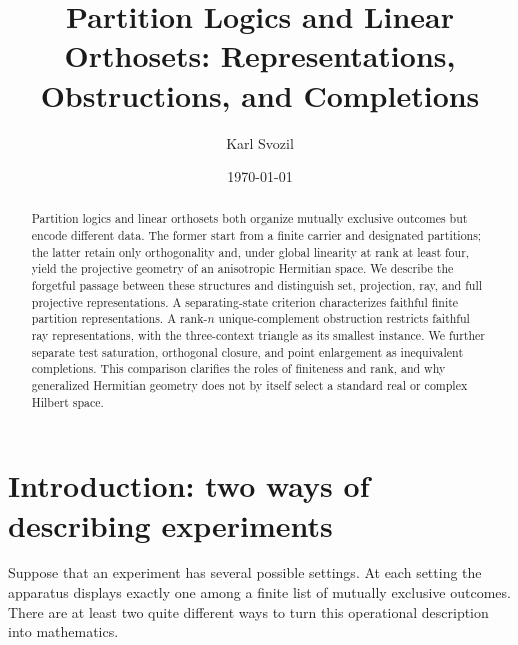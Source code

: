 \documentclass[
  aps,
  pra,
  twocolumn,
  amsmath,
  amssymb,
  longbibliography,
  nofootinbib,
  floatfix
]{revtex4-2}
\begin{document}
\title{Partition Logics and Linear Orthosets:
Representations, Obstructions, and Completions}

\author{Karl Svozil}

\date{\today}

\begin{abstract}
Partition logics and linear orthosets both organize mutually exclusive
outcomes but encode different data.  The former start from a finite carrier and
designated partitions; the latter retain only orthogonality and, under global
linearity at rank at least four, yield the projective geometry of an anisotropic
Hermitian space.  We describe the forgetful passage between these structures
and distinguish set, projection, ray, and full projective representations.  A
separating-state criterion characterizes faithful finite partition
representations.  A rank-$n$ unique-complement obstruction restricts faithful
ray representations, with the three-context triangle as its smallest instance.
We further separate test saturation, orthogonal closure, and point enlargement
as inequivalent completions.  This comparison clarifies the roles of finiteness
and rank, and why generalized Hermitian geometry does not by itself select a
standard real or complex Hilbert space.
\end{abstract}


\maketitle

\section{Introduction: two ways of describing experiments}
\label{sec:introduction}

Suppose that an experiment has several possible settings.  At each setting the
apparatus displays exactly one among a finite list of mutually exclusive
outcomes.  There are at least two quite different ways to turn this operational
description into mathematics.
\end{document}
